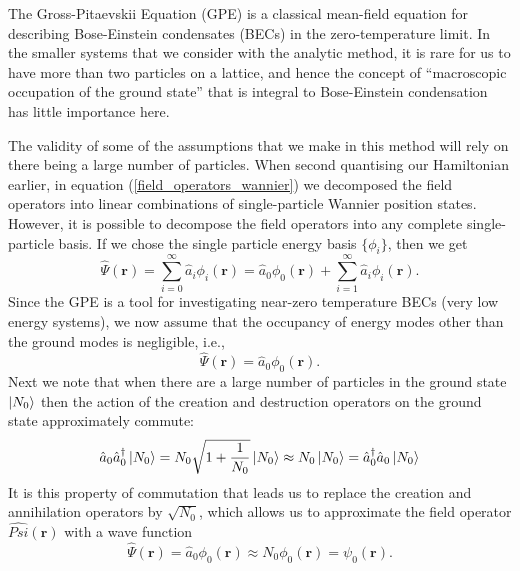 \documentclass[a4paper, 10pt]{article}
\theoremstyle{plain}
\begin{document}
The Gross-Pitaevskii Equation (GPE) is a classical mean-field equation for
describing Bose-Einstein condensates (BECs) in the zero-temperature limit. In
the smaller systems that we consider with the analytic method, it is rare for us
to have more than two particles on a lattice, and hence the concept of
``macroscopic occupation of the ground state'' that is integral to Bose-Einstein
condensation has little importance here.

The validity of some of the assumptions that we make in this
method will rely on there being a large number of particles. When second
quantising our Hamiltonian earlier, in equation (\ref{field_operators_wannier})
we decomposed the field operators into linear combinations of single-particle
Wannier position states. However, it is possible to decompose the field
operators into any complete single-particle basis. If we chose the single
particle energy basis $\{\phi_i\}$, then we get
\begin{equation}
    \hat{\Psi}(\mathbf{r})
    =
    \sum_{i=0}^{\infty}{\hat{a}_i\phi_{i}(\mathbf{r})}
    =
    \hat{a}_{0} \phi_{0}(\mathbf{r}) +
    \sum_{i=1}^{\infty}{\hat{a}_i\phi_{i}(\mathbf{r})}.
\end{equation}
Since the GPE is a tool for investigating near-zero temperature BECs (very low
energy systems), we now assume that the occupancy of energy modes other than
the ground modes is negligible, i.e.,
\begin{equation}
 \hat{\Psi}(\mathbf{r})=\hat{a}_0\phi_{0}(\mathbf{r}).
\end{equation}
Next we note that when there are a large number of particles in the ground
state $\ket{N_0}$ then the action of the creation and destruction operators
on the ground state approximately commute:
\begin{equation}
 \hat{a}_0\hat{a}^\dagger_0\ket{N_0}
 =
 N_0 \sqrt{1+\frac{1}{N_0}}\ket{N_0}
 \approx
 N_0\ket{N_0}
 =
 \hat{a}^\dagger_0\hat{a}_0\ket{N_0}
\end{equation}
It is this property of commutation that leads us to replace the creation and
annihilation operators by $\sqrt{N_0}$, which allows us to approximate the
field operator $\hat{Psi}(\mathbf{r})$ with a wave function
\begin{equation}
    \hat{\Psi}(\mathbf{r})
    =
    \hat{a}_{0} \phi_{0}(\mathbf{r}) \approx N_{0} \phi_{0}(\mathbf{r})
    =
    \psi_{0}(\mathbf{r}).
\end{equation}
\end{document}
